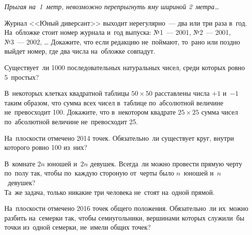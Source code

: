 



\emph{Прыгая на~1~метр, невозможно перепрыгнуть яму шириной 2~метра\ldots}

\begin{problems}

\item
Журнал <<Юный диверсант>> выходит нерегулярно~--- два или три раза в~год.
На~обложке стоит номер журнала и~год выпуска:
№1~--- 2001, №2~--- 2001, №3~--- 2002, \ldots{}
Докажите, что если редакцию не~поймают, то~рано или поздно выйдет номер, где
два числа на~обложке совпадут.

\item
Существует~ли 1000 последовательных натуральных чисел, среди которых ровно
5~простых?

\item
В~некоторых клетках квадратной таблицы $50 \times 50$ расставлены числа $+1$
и~$-1$ таким образом, что сумма всех чисел в~таблице по~абсолютной величине
не~превосходит 100.
Докажите, что в~некотором квадрате $25 \times 25$ сумма чисел по~абсолютной
величине не~превосходит 25.

\item
На~плоскости отмечено 2014 точек.
Обязательно~ли существует круг, внутри которого ровно 100 из~них?

\item
\sp
В~комнате $2n$ юношей и~$2n$ девушек.
Всегда~ли можно провести прямую черту по~полу так, чтобы по~каждую стороную
от~черты было $n$~юношей и~$n$~девушек?
\\
\sp
Та~же задача, только никакие три человека не~стоят на~одной прямой.

\item
На~плоскости отмечено 2016 точек общего положения.
Обязательно~ли их~можно разбить на~семерки так, чтобы семиугольники, вершинами
которых служили~бы точки из~одной семерки, не~имели общих точек?

\end{problems}

